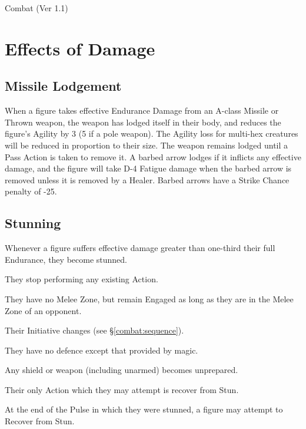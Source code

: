 \begin{Chapter}{Combat (Ver 1.1)}
\section{Effects of Damage}
\label{combat:effects}

\subsection{Missile Lodgement}

When a figure takes effective Endurance Damage from an A-class Missile
or Thrown weapon, the weapon has lodged itself in their body, and
reduces the figure’s Agility by 3 (5 if a pole weapon). The Agility
loss for multi-hex creatures will be reduced in proportion to their
size.  The weapon remains lodged until a Pass Action is taken to
remove it. A barbed arrow lodges if it inflicts any effective damage,
and the figure will take D-4 Fatigue damage when the barbed arrow is
removed unless it is removed by a Healer. Barbed arrows have a Strike
Chance penalty of -25.

\subsection{Stunning}

Whenever a figure suffers effective damage greater than one-third
their full Endurance, they become stunned.

\begin{Itemize}

\item They stop performing any existing Action.  

\item They have no Melee Zone, but remain Engaged as long as they are
  in the Melee Zone of an opponent.

\item Their Initiative changes (see \S\ref{combat:sequence}).

\item They have no defence except that provided by magic.

\item Any shield or weapon (including unarmed) becomes unprepared.

\item Their only Action which they may attempt is recover from Stun.

\item At the end of the Pulse in which they were stunned, a figure may
  attempt to Recover from Stun.


\end{Itemize}
\end{Chapter}
